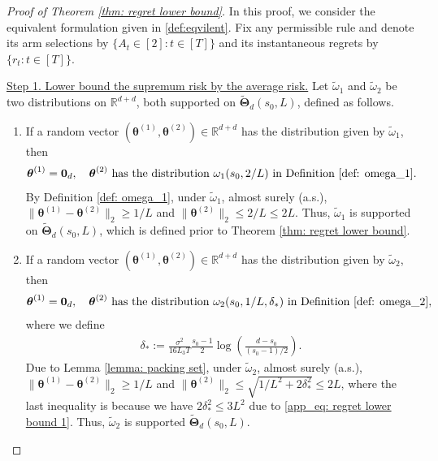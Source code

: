 \documentclass[aos,preprint]{imsart}
\theoremstyle{plain}
\theoremstyle{definition}
\newcommand{\bTheta}{\boldsymbol{\Theta}}
\newcommand{\btheta}{\boldsymbol{\theta}}
\newcommand{\bd}[1]{\boldsymbol{#1}}
\newcommand{\bR}{\mathbb{R}}
\begin{document}
\begin{appendix}
\begin{proof}[Proof of Theorem \ref{thm: regret lower bound}]
In this proof, we consider the equivalent formulation given in \eqref{def:eqvilent}. Fix any permissible rule and denote its arm selections by $\{A_t \in [2] : t \in [T]\}$ and its instantaneous regrets by $\{r_t: t \in [T]\}$.

\medskip
\noindent \underline{Step 1. Lower bound the supremum risk by the average risk.} 
Let $\tilde{\omega}_1$ and $\tilde{\omega}_2$ be two distributions on $\bR^{d+d}$, both supported on $\widetilde{\bTheta}_{d}(s_0,L)$, defined as follows.

\begin{enumerate}[label=\roman*)]
    \item If a random vector 
 $(\btheta^{(1)}, \btheta^{(2)}) \in \bR^{d+d}$ has the distribution given by $\tilde{\omega}_1$, then 
\begin{align}
    &\btheta^{(1)}=\bd{0}_d, \quad \btheta^{(2)} \text{ has the distribution } \omega_1(s_0, 2/L) \text{ in Definition } \ref{def: omega_1}. \label{eq: instance 1}
\end{align}
By Definition \ref{def: omega_1}, under $\tilde{\omega}_1$, almost surely (a.s.), $\|\btheta^{(1)} - \btheta^{(2)}\|_2 \geq 1/L$ and $\|\btheta^{(2)}\|_2 \leq 2/L \leq 2L$.
Thus, $\tilde{\omega}_1$ is supported on $\widetilde{\bTheta}_{d}(s_0,L)$, which is defined prior to Theorem \ref{thm: regret lower bound}.

\item If a random vector $(\btheta^{(1)}, \btheta^{(2)}) \in \bR^{d+d}$ has the distribution given by $\tilde{\omega}_2$, then 
\begin{align}
    \btheta^{(1)}=\bd{0}_d, \quad \btheta^{(2)} \text{ has the distribution } \omega_2(s_0,1/L,\delta_{*}) \text{ in Definition } \ref{def: omega_2}, \label{eq: instance 2}
\end{align}
where we define
\begin{align*}
  \delta_{*} := \frac{\sigma^2}{16 L_3 T} \frac{s_0-1}{2} \log\left(\frac{d-s_0}{(s_0-1)/2}  \right).
\end{align*}
Due to Lemma \ref{lemma: packing set}, under $\tilde{\omega}_2$, almost surely (a.s.), $\|\btheta^{(1)}-\btheta^{(2)}\|_2 \geq 1/L$ and $\|\btheta^{(2)}\|_2 \leq \sqrt{1/L^2 + 2 \delta_*^2}\le 2L$, where the last inequality is because we have $2\delta_*^2\le 3L^2$ due to \eqref{app_eq: regret lower bound 1}. Thus,  $\tilde{\omega}_2$ is supported $\widetilde{\bTheta}_{d}(s_0,L)$.
\end{enumerate}



\end{proof}
\end{appendix}
\end{document}
